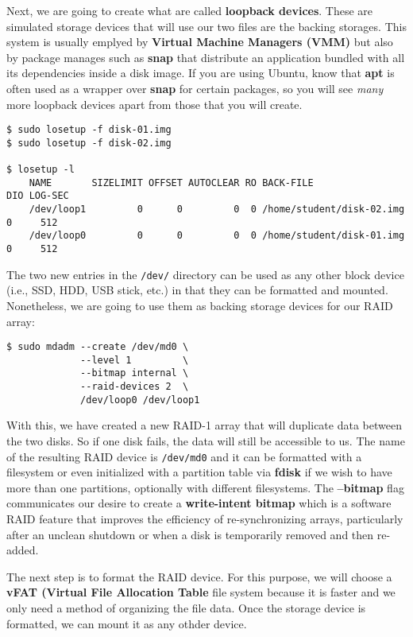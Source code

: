 Next, we are going to create what are called \textbf{loopback devices}. These
are simulated storage devices that will use our two files are the backing
storages. This system is usually emplyed by \textbf{Virtual Machine Managers
(VMM)} but also by package manages such as \textbf{snap} that distribute an
application bundled with all its dependencies inside a disk image. If you are
using Ubuntu, know that \textbf{apt} is often used as a wrapper over
\textbf{snap} for certain packages, so you will see \textit{many} more loopback
devices apart from those that you will create.

\begin{lstlisting}[style=bashstyle]
$ sudo losetup -f disk-01.img
$ sudo losetup -f disk-02.img

$ losetup -l
    NAME       SIZELIMIT OFFSET AUTOCLEAR RO BACK-FILE                 DIO LOG-SEC
    /dev/loop1         0      0         0  0 /home/student/disk-02.img   0     512
    /dev/loop0         0      0         0  0 /home/student/disk-01.img   0     512
\end{lstlisting}

The two new entries in the \texttt{/dev/} directory can be used as any other
block device (i.e., SSD, HDD, USB stick, etc.) in that they can be formatted and
mounted. Nonetheless, we are going to use them as backing storage devices for
our RAID array:

\begin{lstlisting}[style=bashstyle]
$ sudo mdadm --create /dev/md0 \
             --level 1         \
             --bitmap internal \
             --raid-devices 2  \
             /dev/loop0 /dev/loop1
\end{lstlisting}

With this, we have created a new RAID-1 array that will duplicate data between
the two disks. So if one disk fails, the data will still be accessible to us.
The name of the resulting RAID device is \texttt{/dev/md0} and it can be
formatted with a filesystem or even initialized with a partition table via
\textbf{fdisk} if we wish to have more than one partitions, optionally with
different filesystems. The \textbf{--bitmap} flag communicates our desire to
create a \textbf{write-intent bitmap} which is a software RAID feature that
improves the efficiency of re-synchronizing arrays, particularly after an
unclean shutdown or when a disk is temporarily removed and then re-added.

The next step is to format the RAID device. For this purpose, we will choose
a \textbf{vFAT (Virtual File Allocation Table} file system because it is faster
and we only need a method of organizing the file data. Once the storage device
is formatted, we can mount it as any othder device.

